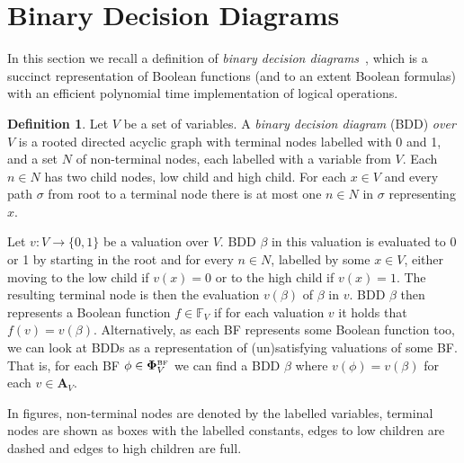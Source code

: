 \documentclass[
  digital, %
  color,
  twoside, %
  table,   %
  nolof,     %
  nolot,     %
]{fithesis3}
\theoremstyle{definition}
\newtheorem{definition}{Definition}
\theoremstyle{remark}
\newcommand{\BF}[1]{\mathbf{\Phi}_{#1}^{\normalfont{\text{\tiny BF}}}}
\newcommand{\valtns}[1]{\mathbf{A}_{#1}}
\newcommand{\BFuncs}[1]{\mathbb{F}_{#1}}
\begin{document}
\section{Binary Decision Diagrams}
\label{sec:BDD}
In this section we recall a definition of \emph{binary decision diagrams}~\cite{BDD}, which is a succinct representation of Boolean functions (and to an extent Boolean formulas) with an efficient polynomial time implementation of logical operations.

\begin{definition}
  Let $V$ be a set of variables. A \emph{binary decision diagram} (BDD) \emph{over $V$} is a rooted directed acyclic graph with terminal nodes labelled with 0 and 1, and a set $N$ of non-terminal nodes, each labelled with a variable from $V$. Each $n \in N$ has two child nodes, low child and high child. For each $x \in V$ and every path $\sigma$ from root to a terminal node there is at most one $n \in N$ in $\sigma$ representing $x$.
\end{definition}

Let $v\colon V \to \{0,1\}$ be a valuation over $V$. BDD $\beta$ in this valuation is evaluated to 0 or 1 by starting in the root and for every $n \in N$, labelled by some $x \in V$, either moving to the low child if $v(x) = 0$ or to the high child if $v(x) = 1$. The resulting terminal node is then the evaluation $v(\beta)$ of $\beta$ in $v$. BDD $\beta$ then represents a Boolean function $f \in \BFuncs{V}$ if for each valuation $v$ it holds that $f(v) = v(\beta)$. Alternatively, as each BF represents some Boolean function too, we can look at BDDs as a representation of (un)satisfying valuations of some BF. That is, for each BF $\phi \in \BF{V}$ we can find a BDD $\beta$ where $v(\phi) = v(\beta)$ for each $v \in \valtns{V}$. %

In figures, non-terminal nodes are denoted by the labelled variables, terminal nodes are shown as boxes with the labelled constants, edges to low children are dashed and edges to high children are full.
\end{document}
